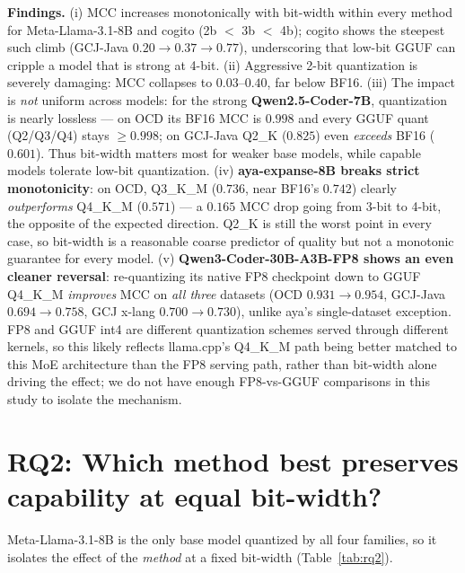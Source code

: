 \documentclass[11pt]{article}
\begin{document}
\noindent\textbf{Findings.} (i) MCC increases monotonically with
bit-width within every method for Meta-Llama-3.1-8B and cogito (2b $<$ 3b $<$
4b); cogito shows the steepest such climb (GCJ-Java
$0.20\!\rightarrow\!0.37\!\rightarrow\!0.77$), underscoring that low-bit GGUF
can cripple a model that is strong at 4-bit. (ii) Aggressive 2-bit quantization
is severely damaging: MCC collapses to $0.03$--$0.40$, far below BF16. (iii)
The impact is \emph{not} uniform across models: for the strong
\textbf{Qwen2.5-Coder-7B}, quantization is nearly lossless --- on OCD its BF16
MCC is $0.998$ and every GGUF quant (Q2/Q3/Q4) stays $\ge 0.998$; on GCJ-Java
Q2\_K ($0.825$) even \emph{exceeds} BF16 ($0.601$). Thus bit-width matters most
for weaker base models, while capable models tolerate low-bit quantization.
(iv) \textbf{aya-expanse-8B breaks strict monotonicity}: on OCD, Q3\_K\_M
($0.736$, near BF16's $0.742$) clearly \emph{outperforms} Q4\_K\_M ($0.571$) ---
a $0.165$ MCC drop going from 3-bit to 4-bit, the opposite of the expected
direction. Q2\_K is still the worst point in every case, so bit-width is a
reasonable coarse predictor of quality but not a monotonic guarantee for every
model. (v) \textbf{Qwen3-Coder-30B-A3B-FP8 shows an even cleaner reversal}:
re-quantizing its native FP8 checkpoint down to GGUF Q4\_K\_M \emph{improves}
MCC on \emph{all three} datasets (OCD $0.931\!\rightarrow\!0.954$, GCJ-Java
$0.694\!\rightarrow\!0.758$, GCJ x-lang $0.700\!\rightarrow\!0.730$), unlike
aya's single-dataset exception. FP8 and GGUF int4 are different quantization
schemes served through different kernels, so this likely reflects llama.cpp's
Q4\_K\_M path being better matched to this MoE architecture than the FP8
serving path, rather than bit-width alone driving the effect; we do not have
enough FP8-vs-GGUF comparisons in this study to isolate the mechanism.

\section{RQ2: Which method best preserves capability at equal bit-width?}
Meta-Llama-3.1-8B is the only base model quantized by all four families, so it
isolates the effect of the \emph{method} at a fixed bit-width
(Table~\ref{tab:rq2}).
\end{document}
